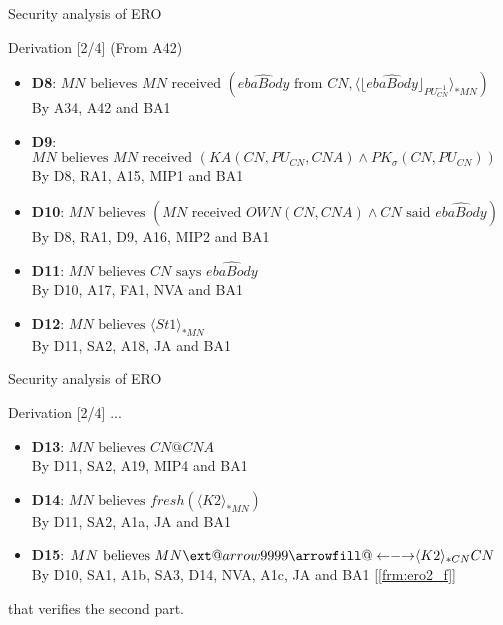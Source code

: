 \documentclass[10pt]{beamer}
\makeatletter
\newcommand\xleftrightarrow[2][]{%
  \ext@arrow 9999{\longleftrightarrowfill@}{#1}{#2}}
\newcommand\longleftrightarrowfill@{%
  \arrowfill@\leftarrow\relbar\rightarrow}
\newcommand{\xtext}[1]{\text{ #1 }}
\makeatother
\begin{document}
\begin{frame}{Security analysis of ERO}
	\begin{block}{Derivation [2/4]}
		(From A42)
		\begin{itemize}
			\item \textbf{D8}: {\small $MN \xtext{believes} MN \xtext{received} (\widehat{ebaBody} \xtext{from} CN, \langle \lfloor \widehat{ebaBody}\rfloor_{PU_{CN}^{-1}}\rangle_{*MN})$ \\ \hspace{1.7cm} By A34, A42 and BA1}
			\item \textbf{D9}: {\small $MN \xtext{believes} MN \xtext{received} (KA(CN,PU_{CN}, CNA) \land PK_\sigma(CN, PU_{CN}))$ \\ \hspace{1.7cm} By D8, RA1, A15, MIP1 and BA1}
			\item \textbf{D10}: {\small $MN \xtext{believes} (MN \xtext{received} OWN(CN,CNA) \land CN \xtext{said} \widehat{ebaBody})$ \\ \hspace{1.7cm} By D8, RA1, D9, A16, MIP2 and BA1}
			\item \textbf{D11}: {\small $MN \xtext{believes} CN \xtext{says} \widehat{ebaBody}$ \\ \hspace{1.7cm} By D10, A17, FA1, NVA and BA1}
			\item \textbf{D12}: {\small $MN \xtext{believes} \langle St1\rangle_{*MN}$ \\ \hspace{1.7cm} By D11, SA2, A18, JA and BA1}
		\end{itemize}
	\end{block}
\end{frame}
\begin{frame}{Security analysis of ERO}
	\begin{block}{Derivation [2/4]}
		\label{frm:ero2_s}
		\vspace{0.4cm}...
		\begin{itemize}
			\item \textbf{D13}: {\small $MN \xtext{believes} CN@CNA$ \\ \hspace{1.7cm} By D11, SA2, A19, MIP4 and BA1}
			\item \textbf{D14}: {\small $MN \xtext{believes} fresh(\langle K2\rangle_{*MN})$ \\ \hspace{1.7cm} By D11, SA2, A1a, JA and BA1}
			\item \textbf{D15}: {\small $MN \xtext{believes} MN \xleftrightarrow{\langle K2\rangle_{*CN}} CN$ \\ \hspace{1.7cm} By D10, SA1, A1b, SA3, D14, NVA, A1c, JA and BA1 [\underline{\ref{frm:ero2_f}}]}
		\end{itemize}
		that verifies the second part.
	\end{block}
\end{frame}
\end{document}
